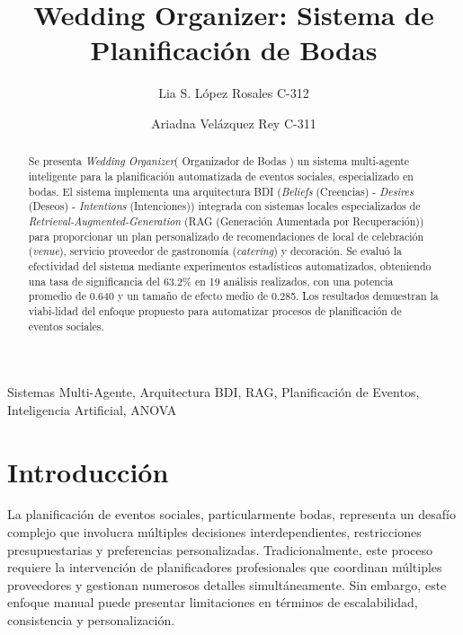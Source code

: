 \documentclass[runningheads,a4paper]{llncs}
\newcommand{\keywords}[1]{\par\addvspace\baselineskip
\noindent\keywordname\enspace\ignorespaces#1}
\begin{document}
\mainmatter

\title{Wedding Organizer: Sistema de Planificación de Bodas}


\author{Lia S. López Rosales C-312 \and Ariadna Velázquez Rey C-311}


\maketitle

\begin{abstract}
Se presenta \textit{Wedding Organizer}( Organizador de Bodas ) un sistema multi-agente inteligente para la planificación 
automatizada de eventos sociales, especializado en bodas. El sistema implementa una arquitectura BDI 
(\textit{Beliefs} (Creencias) - \textit{Desires} (Deseos) - \textit{Intentions} (Intenciones))\cite{rao1995bdi} integrada 
con sistemas locales especializados de \textit{Retrieval-Augmented-Generation} (RAG (Generación Aumentada por Recuperación)) 
\cite{lewis2020retrieval} para proporcionar un plan personalizado de recomendaciones de local de celebración (\textit{venue}), 
servicio proveedor de gastronomía (\textit{catering}) y decoración. Se evaluó la efectividad del sistema mediante 
experimentos estadísticos automatizados, obteniendo una tasa de significancia del 63.2\% en 19 análisis realizados, con una 
potencia promedio de 0.640 y un tamaño de efecto medio de 0.285. Los resultados demuestran la viabi-lidad del enfoque 
propuesto para automatizar procesos de planificación de eventos sociales.
\end{abstract}

\keywords{Sistemas Multi-Agente, Arquitectura BDI, RAG, Planificación de Eventos, Inteligencia Artificial, ANOVA}

\section{Introducción}

La planificación de eventos sociales, particularmente bodas, representa un desafío complejo que involucra múltiples 
decisiones interdependientes, restricciones presupuestarias y preferencias personalizadas. Tradicionalmente, este proceso 
requiere la intervención de planificadores profesionales que coordinan múltiples proveedores y gestionan numerosos detalles 
simultáneamente. Sin embargo, este enfoque manual puede presentar limitaciones en términos de escalabilidad, consistencia 
y personalización.
\end{document}

